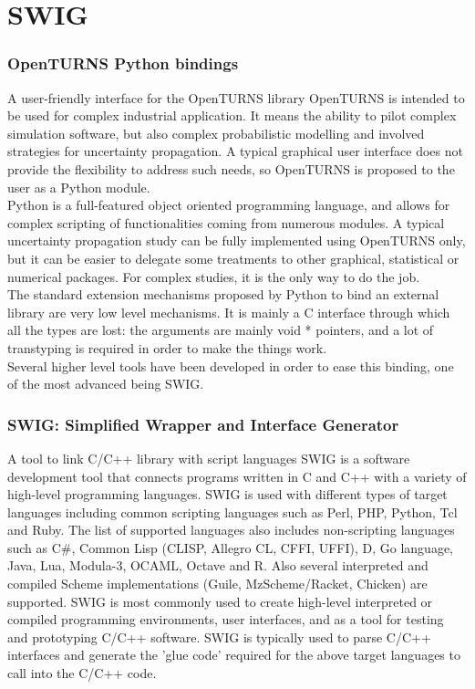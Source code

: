 \documentclass[8pt]{beamer}
\begin{document}
\section[SWIG]{SWIG}
\begin{frame}
  \frametitle{OpenTURNS Python bindings}
  \begin{block}{A user-friendly interface for the OpenTURNS library}
    OpenTURNS is intended to be used for complex industrial application. It means the ability to pilot complex simulation software, but also complex probabilistic modelling and involved strategies for uncertainty propagation. A typical graphical user interface does not provide the flexibility to address such needs, so OpenTURNS is proposed to the user as a Python module.\\
    Python is a full-featured object oriented programming language, and allows for complex scripting of functionalities coming from numerous modules. A typical uncertainty propagation study can be fully implemented using OpenTURNS only, but it can be easier to delegate some treatments to other graphical, statistical or numerical packages. For complex studies, it is the only way to do the job.\\
    The standard extension mechanisms proposed by Python to bind an external library are very low level mechanisms. It is mainly a C interface through which all the types are lost: the arguments are mainly {\ttfamily void *} pointers, and a lot of transtyping is required in order to make the things work.\\
    Several higher level tools have been developed in order to ease this binding, one of the most advanced being SWIG.
  \end{block}
\end{frame}

\begin{frame}
  \frametitle{SWIG: Simplified Wrapper and Interface Generator}
  \begin{block}{A tool to link C/C++ library with script languages}
    SWIG is a software development tool that connects programs written in C and C++ with a variety of high-level programming languages. SWIG is used with different types of target languages including common scripting languages such as Perl, PHP, Python, Tcl and Ruby. The list of supported languages also includes non-scripting languages such as C\#, Common Lisp (CLISP, Allegro CL, CFFI, UFFI), D, Go language, Java, Lua, Modula-3, OCAML, Octave and R. Also several interpreted and compiled Scheme implementations (Guile, MzScheme/Racket, Chicken) are supported. SWIG is most commonly used to create high-level interpreted or compiled programming environments, user interfaces, and as a tool for testing and prototyping C/C++ software. SWIG is typically used to parse C/C++ interfaces and generate the 'glue code' required for the above target languages to call into the C/C++ code.
  \end{block}
\end{frame}
\end{document}
